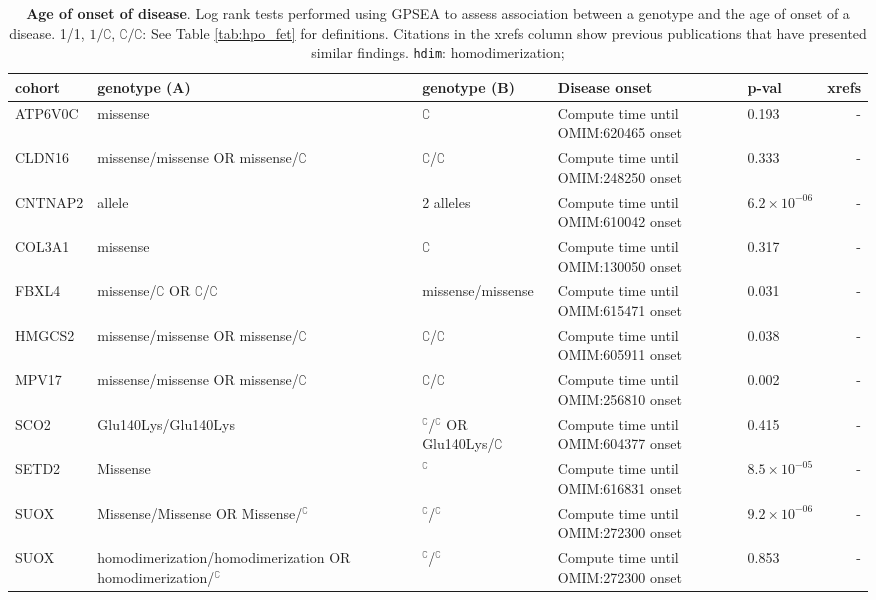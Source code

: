 \begin{table}
\centering
\begin{scriptsize}
\begin{tabular}{l>{\raggedright\arraybackslash}p{4cm}p{2cm}>{\raggedright\arraybackslash}p{2.5cm}lr}
\toprule
\textbf{cohort} & \textbf{genotype (A)} & \textbf{genotype (B)} & \textbf{Disease onset} & \textbf{p-val} & \textbf{xrefs}\\
\midrule
ATP6V0C & missense & $\complement$ & Compute time until OMIM:620465 onset & 0.193 & -\\
CLDN16 & missense/missense OR missense/$\complement$ & $\complement$/$\complement$ & Compute time until OMIM:248250 onset & 0.333 & -\\
CNTNAP2 & 1 allele & 2 alleles & Compute time until OMIM:610042 onset & $6.2 \times 10^{-06}$ & -\\
COL3A1 & missense & $\complement$ & Compute time until OMIM:130050 onset & 0.317 & -\\
FBXL4 & missense/$\complement$ OR $\complement$/$\complement$ & missense/missense & Compute time until OMIM:615471 onset & 0.031 & -\\
HMGCS2 & missense/missense OR missense/$\complement$ & $\complement$/$\complement$ & Compute time until OMIM:605911 onset & 0.038 & -\\
MPV17 & missense/missense OR missense/$\complement$ & $\complement$/$\complement$ & Compute time until OMIM:256810 onset & 0.002 & -\\
SCO2 & Glu140Lys/Glu140Lys & $^{\complement}$/$^{\complement}$ OR Glu140Lys/$\complement$ & Compute time until OMIM:604377 onset & 0.415 & -\\
SETD2 & Missense & $^{\complement}$ & Compute time until OMIM:616831 onset & $8.5 \times 10^{-05}$ & -\\
SUOX & Missense/Missense OR Missense/$^{\complement}$ & $^{\complement}$/$^{\complement}$ & Compute time until OMIM:272300 onset & $9.2 \times 10^{-06}$ & -\\
SUOX & homodimerization/homodimerization OR homodimerization/$^{\complement}$ & $^{\complement}$/$^{\complement}$ & Compute time until OMIM:272300 onset & 0.853 & -\\
\bottomrule
\end{tabular}
\end{scriptsize}
\caption{\textbf{Age of onset of disease}. Log rank tests performed using GPSEA to assess association between a genotype and the age of onset of a disease. 1/1, $1/\complement$, $\complement/\complement$: See Table \ref{tab:hpo_fet} for definitions. Citations in the xrefs column show previous publications that have presented similar findings. \texttt{hdim}: homodimerization;
}
\end{table}
